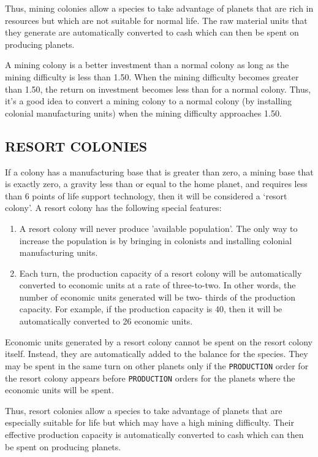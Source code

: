 \documentclass[10pt,titlepage]{article}
\begin{document}
Thus, mining colonies allow a species to take advantage of planets that are
rich in resources but which are not suitable for normal life.  The raw material
units that they generate are automatically converted to cash which can then be
spent on producing planets.

A mining colony is a better investment than a normal colony as long as the
mining difficulty is less than 1.50.  When the mining difficulty becomes
greater than 1.50, the return on investment becomes less than for a normal
colony.  Thus, it's a good idea to convert a mining colony to a normal colony
(by installing colonial manufacturing units) when the mining difficulty
approaches 1.50.


\subsection{RESORT COLONIES}
\label{sec:resotcolonies}


If a colony has a manufacturing base that is greater than zero, a mining base
that is exactly zero, a gravity less than or equal to the home planet, and
requires less than 6 points of life support technology, then it will be
considered a `resort colony'.  A resort colony has the following special
features:
\begin{enumerate}
	\item  A resort colony will never produce 'available population'.  The
	only way to increase the population is by bringing in colonists
	and installing colonial manufacturing units.

	\item Each turn, the production capacity of a resort colony will be
	automatically converted to economic units at a rate of three-to-two.
	In other words, the number of economic units generated will be two-
	thirds of the production capacity.  For example, if the production
	capacity is 40, then it will be automatically converted to 26
	economic units.
\end{enumerate}

Economic units generated by a resort colony cannot be spent on the resort
colony itself.  Instead, they are automatically added to the balance for the
species.  They may be spent in the same turn on other planets only if the
\texttt{PRODUCTION} order for the resort colony appears before \texttt{PRODUCTION} orders for
the planets where the economic units will be spent.

Thus, resort colonies allow a species to take advantage of planets that are
especially suitable for life but which may have a high mining difficulty.
Their effective production capacity is automatically converted to cash which
can then be spent on producing planets.
\end{document}
